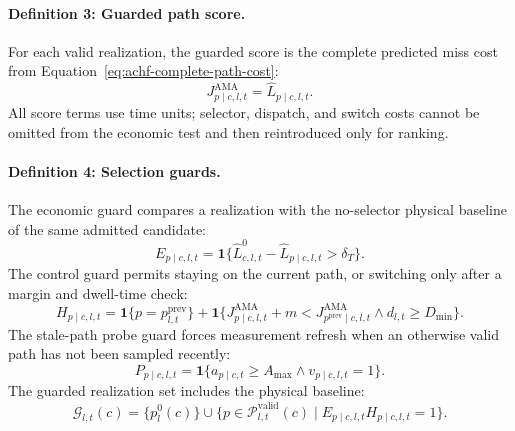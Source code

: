 \documentclass{article}
\begin{document}
\paragraph{Definition 3: Guarded path score.}
For each valid realization, the guarded score is the complete predicted miss
cost from Equation~\eqref{eq:achf-complete-path-cost}:
\begin{equation}
J^{\mathrm{AMA}}_{p\mid c,l,t}=\widehat L_{p\mid c,l,t}.
\label{eq:ama-score}
\end{equation}
All score terms use time units; selector, dispatch, and switch costs cannot be
omitted from the economic test and then reintroduced only for ranking.

\paragraph{Definition 4: Selection guards.}
The economic guard compares a realization with the no-selector physical
baseline of the same admitted candidate:
\begin{equation}
E_{p\mid c,l,t}
=\mathbf{1}\{\widehat L^0_{c,l,t}-\widehat L_{p\mid c,l,t}>\delta_T\}.
\label{eq:ama-economic-guard}
\end{equation}
The control guard permits staying on the current path, or switching only after
a margin and dwell-time check:
\begin{equation}
H_{p\mid c,l,t}
=
\mathbf{1}\{p=p^{\mathrm{prev}}_{l,t}\}
+
\mathbf{1}\{
J^{\mathrm{AMA}}_{p\mid c,l,t}+m
<
J^{\mathrm{AMA}}_{p^{\mathrm{prev}}\mid c,l,t}
\land
d_{l,t}\ge D_{\min}
\}.
\label{eq:ama-control-guard}
\end{equation}
The stale-path probe guard forces measurement refresh when an otherwise valid
path has not been sampled recently:
\begin{equation}
P_{p\mid c,l,t}
=
\mathbf{1}\{a_{p\mid c,t}\ge A_{\max}\land v_{p\mid c,l,t}=1\}.
\label{eq:ama-probe-guard}
\end{equation}
The guarded realization set includes the physical baseline:
\begin{equation}
\mathcal{G}_{l,t}(c)
=
\{p_l^0(c)\}\cup
\{p\in\mathcal{P}^{\mathrm{valid}}_{l,t}(c)
\mid E_{p\mid c,l,t}H_{p\mid c,l,t}=1\}.
\label{eq:ama-guarded-set}
\end{equation}
\end{document}
